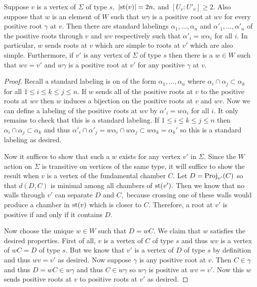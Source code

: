\documentclass[class=book, crop=false,12 pt]{standalone}
\begin{document}
\begin{lemma}
	\label{lem:resporder}
	Suppose $v$ is a vertex of $\Sigma$ of type $s,$ $|\mathrm{st}(v)|=2n,$ and $[U_v:U'_v]\ge 2.$ Also suppose that $w$ is an element of $W$ such that $w\gamma$ is a positive root at $wv$ for every positive root $\gamma$ at $v.$ Then there are standard labelings $\alpha_1,\dots,\alpha_n$ and $\alpha'_1,\dots,\alpha'_n$ of the positive roots through $v$ and $wv$ respectively such that $\alpha'_i=w\alpha_i$ for all $i.$ In particular, $w$ sends roots at $v$ which are simple to roots at $v'$ which are also simple. Furthermore, if $v'$ is any vertex of $\Sigma$ of type $s$ then there is a $w\in W$ such that $wv=v'$ and $w\gamma$ is a positive root at $v'$ for any positive $\gamma$ at $v.$
\end{lemma}
\begin{proof}
	Recall a standard labeling is on of the form $\alpha_1,\dots, \alpha_n$ where $\alpha_i\cap \alpha_j\subset \alpha_k$ for all $1\le i\le k\le j\le n.$ If $w$ sends all of the positive roots at $v$ to the positive roots at $wv$ then $w$ induces a bijection on the positive roots at $v$ and $wv.$ Now we can define a labeling of the positive roots at $wv$ by $\alpha'_i=w\alpha_i$ for all $i.$ It only remains to check that this is a standard labeling. If $1\le i\le k\le j\le n$ then $\alpha_i\cap \alpha_j\subset \alpha_k$ and thus $\alpha'_i\cap \alpha'_j=w\alpha_i\cap w\alpha_j\subset w\alpha_k=\alpha_k'$ so this is a standard labeling as desired.

Now it suffices to show that such a $w$ exists for any vertex $v'$ in $\Sigma.$ Since the $W$ action on $\Sigma$ is transitive on vertices of the same type, it will suffice to show the result when $v$ is a vertex of the fundamental chamber $C.$ Let $D=\mathrm{Proj}_{v'}(C)$ so that $d(D,C)$ is minimal among all chambers of $\mathrm{st}(v').$ Then we know that no walls through $v'$ can separate $D$ and $C,$ because crossing one of these walls would produce a chamber in $\mathrm{st}(v)$ which is closer to $C.$ Therefore, a root at $v'$ is positive if and only if it contains $D.$

Now choose the unique $w\in W$ such that $D=wC.$ We claim that $w$ satisfies the desired properties. First of all, $v$ is a vertex of $C$ of type $s$ and thus $wv$ is a vertex of $wC=D$ of type $s.$ But we know that $v'$ is a vertex of $D$ of type $s$ by definition and thus $wv=v'$ as desired. Now suppose $\gamma$ is any positive root at $v.$ Then $C\in \gamma$ and thus $D=wC\in w\gamma$ and thus $C\in w\gamma$ so $w\gamma$ is positive at $wv=v'.$ Now this $w$ sends positive roots at $v$ to positive roots at $v'$ as desired.

\end{proof}
\end{document}
